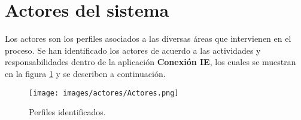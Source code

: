 \section{Actores del sistema}\label{sec:Comportamiento:ActoresSistema}

Los actores son los perfiles asociados a las diversas áreas que intervienen en el proceso. Se han identificado los actores de acuerdo a las actividades y responsabilidades dentro de la aplicación \textbf{Conexión IE}, los cuales se muestran en la figura \ref{fig:perfilesPAEAR} y se describen a continuación.


    \begin{figure}[h!]
      \begin{center}
	  \texttt{[image: images/actores/Actores.png]}
      \caption{Perfiles identificados.}
      \label{fig:perfilesPAEAR}
      \end{center}
    \end{figure}

